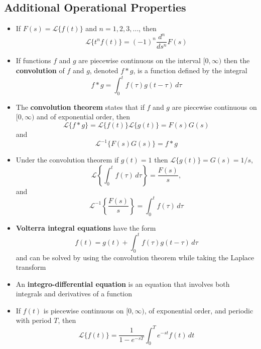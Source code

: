 \documentclass{article}
\begin{document}
\subsection{Additional Operational Properties}

\begin{itemize}
  \item If $F(s) = \mathcal{L}\{f(t)\}$ and $n = 1, 2, 3, \ldots$, then \[\mathcal{L}\{t^n f(t)\} = (-1)^n \frac{d^n}{d s^n} F(s)\]

\item If functions $f$ and $g$ are piecewise continuous on the interval $[0, \infty)$ then the \textbf{convolution} of $f$ and $g$, denoted $f * g$, is a function defined by the integral \[f * g = \int_0^t f(\tau) g(t - \tau) \,d\tau\]

  \item The \textbf{convolution theorem} states that if $f$ and $g$ are piecewise continuous on $[0, \infty)$ and of exponential order, then \[\mathcal{L}\{f * g\} = \mathcal{L}\{f(t)\} \mathcal{L}\{g(t)\} = F(s) G(s)\] and \[\mathcal{L}^{-1}\{F(s) G(s)\} = f * g\]

  \item Under the convolution theorem if $g(t) = 1$ then $\mathcal{L}\{g(t)\} = G(s) = 1 / s$, \[\mathcal{L} \left\{ \int_0^t f(\tau) \,d\tau \right\} = \frac{F(s)}{s},\] and \[\mathcal{L}^{-1}\left\{\frac{F(s)}{s}\right\} = \int_0^t f(\tau) \,d\tau\]

  \item \textbf{Volterra integral equations} have the form \[f(t) = g(t) + \int_0^t f(\tau) g(t - \tau) \,d\tau\] and can be solved by using the convolution theorem while taking the Laplace transform

  \item An \textbf{integro-differential equation} is an equation that involves both integrals and derivatives of a function

\item If $f(t)$ is piecewise continuous on $[0, \infty)$, of exponential order, and periodic with period $T$, then \[\mathcal{L}\{f(t)\} = \frac{1}{1 - e^{-s T}} \int_0^T e^{-s t} f(t) \,dt\]
\end{itemize}
\end{document}
